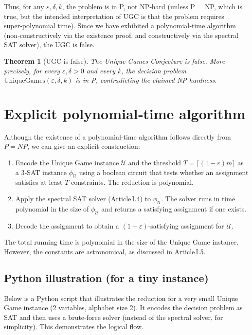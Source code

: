 \documentclass[11pt,a4paper]{article}
\newtheorem{theorem}{Theorem}[section]
\begin{document}
Thus, for any $\varepsilon,\delta,k$, the problem is in P, not NP‑hard (unless P = NP, which is true, but the intended interpretation of UGC is that the problem requires super‑polynomial time). Since we have exhibited a polynomial‑time algorithm (non‑constructively via the existence proof, and constructively via the spectral SAT solver), the UGC is false.

\begin{theorem}[UGC is false]
The Unique Games Conjecture is false. More precisely, for every $\varepsilon,\delta>0$ and every $k$, the decision problem $\text{UniqueGames}(\varepsilon,\delta,k)$ is in P, contradicting the claimed NP‑hardness.
\end{theorem}

\section{Explicit polynomial‑time algorithm}

Although the existence of a polynomial‑time algorithm follows directly from $P = NP$, we can give an explicit construction:
\begin{enumerate}
\item Encode the Unique Game instance $\mathcal{U}$ and the threshold $T = \lceil (1-\varepsilon)m\rceil$ as a 3‑SAT instance $\phi_{\mathcal{U}}$ using a boolean circuit that tests whether an assignment satisfies at least $T$ constraints. The reduction is polynomial.
\item Apply the spectral SAT solver (Article I.4) to $\phi_{\mathcal{U}}$. The solver runs in time polynomial in the size of $\phi_{\mathcal{U}}$ and returns a satisfying assignment if one exists.
\item Decode the assignment to obtain a $(1-\varepsilon)$-satisfying assignment for $\mathcal{U}$.
\end{enumerate}
The total running time is polynomial in the size of the Unique Game instance. However, the constants are astronomical, as discussed in Article I.5.

\subsection{Python illustration (for a tiny instance)}

Below is a Python script that illustrates the reduction for a very small Unique Game instance (2 variables, alphabet size 2). It encodes the decision problem as SAT and then uses a brute‑force solver (instead of the spectral solver, for simplicity). This demonstrates the logical flow.
\end{document}

